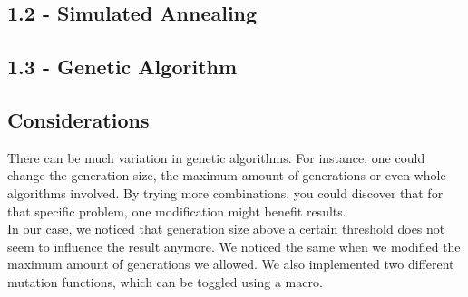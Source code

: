 \documentclass{article}
\begin{document}
\begin{enumerate}[1.]
\begin{center}
\end{center}
\end{enumerate}

\subsection*{1.2 - Simulated Annealing}
\subsection*{1.3 - Genetic Algorithm}
\subsection*{Considerations}
There can be much variation in genetic algorithms. For instance, one could change the generation size, the maximum amount of generations or even whole algorithms involved. By trying more combinations, you could discover that for that specific problem, one modification might benefit results.\\
In our case, we noticed that generation size above a certain threshold does not seem to influence the result anymore. We noticed the same when we modified the maximum amount of generations we allowed. We also implemented two different mutation functions, which can be toggled using a macro.
\end{document}

